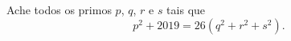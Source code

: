 Ache todos os primos $p$, $q$, $r$ e $s$ tais que
$$p^2 + 2019 = 26 \left( q^2 + r^2 + s^2 \right).$$
